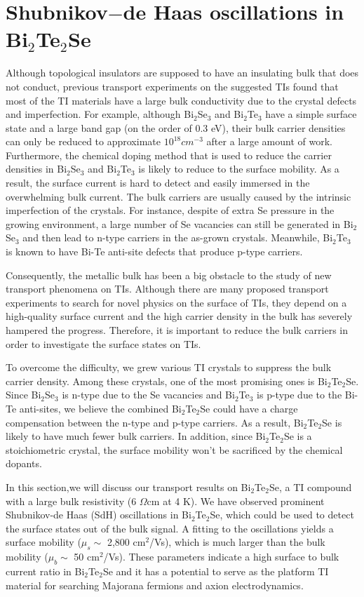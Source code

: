 
\chapter{Shubnikov$-$de Haas oscillations in Bi$_2$Te$_2$Se\label{ch:bts}}

Although topological insulators are supposed to have an insulating bulk that does not conduct, previous transport experiments on the suggested TIs found that most of the TI materials have a large bulk conductivity due to the crystal defects and imperfection. For example, although Bi$_2$Se$_3$ and Bi$_2$Te$_3$ have a simple surface state and a large band gap (on the order of 0.3 eV), their bulk carrier densities can only be reduced to approximate $10^{18} cm^{-3}$ after a large amount of work. Furthermore, the chemical doping method that is used to reduce the carrier densities in Bi$_2$Se$_3$ and Bi$_2$Te$_3$ is likely to reduce to the surface mobility. As a result, the surface current is hard to detect and easily immersed in the overwhelming bulk current. The bulk carriers are usually caused by the intrinsic imperfection of the crystals. For instance, despite of extra Se pressure in the growing environment, a large number of Se vacancies can still be generated in Bi$_2$Se$_3$ and then lead to n-type carriers in the as-grown crystals. Meanwhile, Bi$_2$Te$_3$ is known to have Bi-Te anti-site defects that produce p-type carriers. 

Consequently, the metallic bulk has been a big obstacle to the study of new transport phenomena on TIs. Although there are many proposed transport experiments to search for novel physics on the surface of TIs, they depend on a high-quality surface current and the high carrier density in the bulk has severely hampered the progress. Therefore, it is important to reduce the bulk carriers in order to investigate the surface states on TIs. 

To overcome the difficulty, we grew various TI crystals to suppress the bulk carrier density. Among these crystals, one of the most promising ones is Bi$_2$Te$_2$Se. Since Bi$_2$Se$_3$ is n-type due to the Se vacancies and Bi$_2$Te$_3$ is p-type due to the Bi-Te anti-sites, we believe the combined Bi$_2$Te$_2$Se could have a charge compensation between the n-type and p-type carriers. As a result, Bi$_2$Te$_2$Se is likely to have much fewer bulk carriers. In addition, since Bi$_2$Te$_2$Se is a stoichiometric crystal, the surface mobility won't be sacrificed by the chemical dopants.

In this section,we will discuss our transport results on Bi$_2$Te$_2$Se, a TI compound with a large bulk resistivity (6 $\Omega$cm at 4 K). We have observed prominent Shubnikov-de Haas (SdH) oscillations in Bi$_2$Te$_2$Se, which could be used to detect the surface states out of the bulk signal. A fitting to the oscillations yields a surface mobility ($\mu_s\sim$ 2,800 cm$^2$/Vs), which is much larger than the bulk mobility ($\mu_b\sim$ 50 cm$^2$/Vs). These parameters indicate a high surface to bulk current ratio in Bi$_2$Te$_2$Se and it has a potential to serve as the platform TI material for searching Majorana fermions and  axion electrodynamics.

